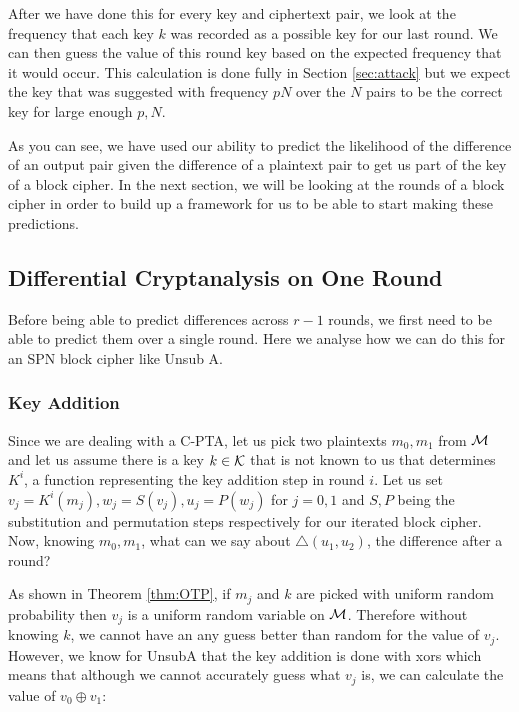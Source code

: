 \documentclass[12pt,a4paper]{article}
\begin{document}
After we have done this for every key and ciphertext pair, we look at the
frequency that each key $k$ was recorded as a possible key for our last round.
We can then guess the value of this round key based on the expected frequency
that it would occur. This calculation is done fully in Section \ref{sec:attack}
but we expect the key that was suggested with frequency $pN$ over the $N$ pairs
to be the correct key for large enough $p,N$.

As you can see, we have used our ability to predict the likelihood of the
difference of an output pair given the difference of a plaintext pair to get us
part of the key of a block cipher. In the next section, we will be looking at the rounds
of a block cipher in order to build up a framework for us to be able to start
making these predictions.

\subsection{Differential Cryptanalysis on One Round}

Before being able to predict differences across $r-1$ rounds, we first need to
be able to predict them over a single round. Here we analyse how we can do this
for an SPN block cipher like Unsub A.

\subsubsection{Key Addition}

Since we are dealing with a C-PTA, let us pick two plaintexts $m_0,m_1$ from
$\cal{M}$ and let us assume there is a key $k \in \cal{K}$ that is not known to us
that determines $K^i$, a function representing the key addition step in round
$i$. Let us set $v_j = K^i(m_j), w_j = S(v_j), u_j = P(w_j)$ for $j =
0,1$ and $S,P$ being the substitution and permutation steps respectively for our iterated
block cipher. Now, knowing $m_0,m_1$, what can we say about
$\triangle(u_1,u_2)$, the difference after a round?

As shown in Theorem \ref{thm:OTP}, if $m_j$ and $k$ are picked
with uniform random probability then $v_j$ is a uniform random variable on
$\cal{M}$.
 Therefore without knowing $k$, we cannot have an any guess better than random for the value
 of $v_j$. However, we know for UnsubA that the key addition is done with xors
which means that although we cannot accurately guess what $v_j$ is, we can calculate the
value of $v_0 \oplus v_1$:
\end{document}
